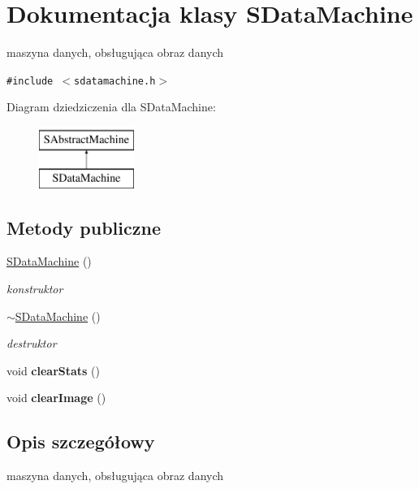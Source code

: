 \hypertarget{classSDataMachine}{
\section{Dokumentacja klasy SDataMachine}
\label{classSDataMachine}
}
maszyna danych, obsługująca obraz danych  


{\tt \#include $<$sdatamachine.h$>$}

Diagram dziedziczenia dla SDataMachine:\begin{figure}[H]
\begin{center}
\leavevmode
\includegraphics[height=2cm]{classSDataMachine}
\end{center}
\end{figure}
\subsection*{Metody publiczne}
\begin{CompactItemize}
\item 
\hyperlink{classSDataMachine_3d894df00bd2283c717a827e27138812}{SDataMachine} ()
\begin{CompactList}\small\item\em konstruktor \item\end{CompactList}\item 
\hyperlink{classSDataMachine_59bc85b25930729cbe3046e81f49f909}{$\sim$SDataMachine} ()
\begin{CompactList}\small\item\em destruktor \item\end{CompactList}\item 
\hypertarget{classSDataMachine_705d76e9ab6ba1c7a0a5b73fd6f3cc2b}{
void \textbf{clearStats} ()}
\label{classSDataMachine_705d76e9ab6ba1c7a0a5b73fd6f3cc2b}

\item 
\hypertarget{classSDataMachine_06c12baf5a7a4f50dd8f43cc9794dafd}{
void \textbf{clearImage} ()}
\label{classSDataMachine_06c12baf5a7a4f50dd8f43cc9794dafd}

\end{CompactItemize}


\subsection{Opis szczegółowy}
maszyna danych, obsługująca obraz danych 

